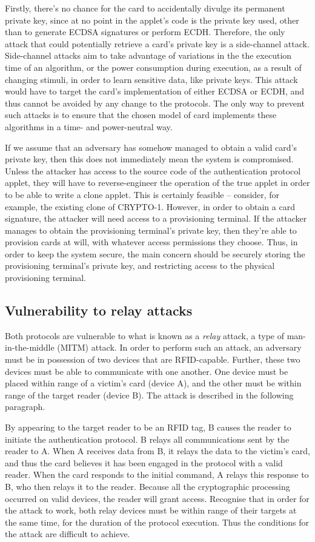 \documentclass[12pt,a4paper,twoside,openright]{report}
\begin{document}
Firstly, there's no chance for the card to accidentally divulge its permanent private key, since at no point in the applet's code is the private key used, other than to generate ECDSA signatures or perform ECDH. Therefore, the only attack that could potentially retrieve a card's private key is a side-channel attack. Side-channel attacks aim to take advantage of variations in the the execution time of an algorithm, or the power consumption during execution, as a result of changing stimuli, in order to learn sensitive data, like private keys. This attack would have to target the card's implementation of either ECDSA or ECDH, and thus cannot be avoided by any change to the protocols. The only way to prevent such attacks is to ensure that the chosen model of card implements these algorithms in a time- and power-neutral way.

If we assume that an adversary has somehow managed to obtain a valid card's private key, then this does not immediately mean the system is compromised. Unless the attacker has access to the source code of the authentication protocol applet, they will have to reverse-engineer the operation of the true applet in order to be able to write a clone applet. This is certainly feasible -- consider, for example, the existing clone of CRYPTO-1. However, in order to obtain a card signature, the attacker will need access to a provisioning terminal. If the attacker manages to obtain the provisioning terminal's private key, then they're able to provision cards at will, with whatever access permissions they choose. Thus, in order to keep the system secure, the main concern should be securely storing the provisioning terminal's private key, and restricting access to the physical provisioning terminal.

\subsection{Vulnerability to relay attacks}

Both protocols are vulnerable to what is known as a \emph{relay} attack, a type of man-in-the-middle (MITM) attack. In order to perform such an attack, an adversary must be in possession of two devices that are RFID-capable. Further, these two devices must be able to communicate with one another. One device must be placed within range of a victim's card (device A), and the other must be within range of the target reader (device B). The attack is described in the following paragraph.

By appearing to the target reader to be an RFID tag, B causes the reader to initiate the authentication protocol. B relays all communications sent by the reader to A. When A receives data from B, it relays the data to the victim's card, and thus the card believes it has been engaged in the protocol with a valid reader. When the card responds to the initial command, A relays this response to B, who then relays it to the reader. Because all the cryptographic processing occurred on valid devices, the reader will grant access. Recognise that in order for the attack to work, both relay devices must be within range of their targets at the same time, for the duration of the protocol execution. Thus the conditions for the attack are difficult to achieve.
\end{document}
